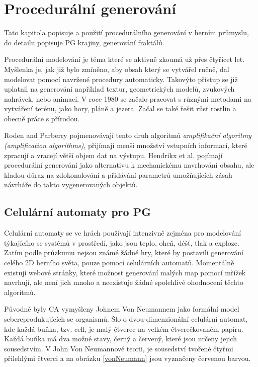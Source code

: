 \textcolor{gray}{\blindtext[10]}

\chapter{Procedurální generování}
\label{procedural}
Tato kapitola popisuje  a použití procedurálního generování v herním průmyslu, do detailu popisuje PG krajiny, generování fraktálů.

Procedurální modelování je téma které se aktivně zkoumá už přes čtyřicet let. Myšlenka je, jak již bylo zmíněno, aby obsah který se vytvářel ručně, dal modelovat pomocí navržené procedury automaticky. Takovýto přístup se již uplatnil na generování například textur, geometrických modelů, zvukových nahrávek, nebo animací. V roce 1980 se začalo pracovat s různými metodami na vytváření terénu, jako hory, pláně a jezera. Začal se také řešit růst rostlin a obecně práce s přírodou. \cite{inproceedings}

Roden and Parberry \cite{FromArtistry} pojmenovávají tento druh algoritmů \textit{amplifikační algoritmy (amplification algorithms)}, přijímají menší množství vstupních informací, které zpracují a vracejí větší objem dat na výstupu. Hendrikx et al. \cite{Hendrikx} pojímají procedurální generování jako alternativu k mechanickému navrhování obsahu, ale kladou důraz na zdokonalování a přidávání parametrů umožňujících zásah návrháře do takto vygenerovaných objektů.

\section{Celulární automaty pro PG}
\label{celular}
Celulární automaty se ve hrách používají intenzivně zejména pro modelování týkajícího se systémů v prostředí, jako jsou teplo, oheň, déšť, tlak a exploze. Zatím podle průzkumu nejsou známé žádné hry, které by postavili generování celého 2D herního světa, pouze pomocí celulárních automatů. Momentálně existují webové stránky, které možnost generování malých map pomocí mřížek navrhují, ale není jich mnoho a neexistuje žádné spolehlivé ohodnocení těchto algoritmů. \cite{articleCellular}

Původně byly CA vymyšleny Johnem Von Neumannem jako formální model sebereprodukujících se organismů. Šlo o dvou-dimenzionální celulární automat, kde každá buňka, tzv. cell, je malý čtverec na velkém čtverečkovaném papíru. Každá buňka má dva možné stavy, černý a červený, které jsou určeny jejich sousedstvím. V John Von Neumannově teorii, je sousedství tvořené čtyřmi přilehlými čtverci a na obrázku \ref{vonNeumann} jsou vyznačeny červenou barvou. \cite{Gong2017}

